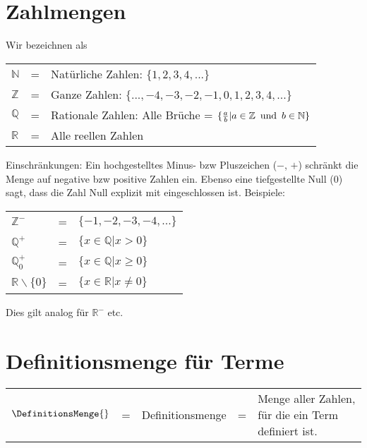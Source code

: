



\usepackage{amssymb} %
\renewcommand{\metaHeaderLine}{Theorieblatt}
\renewcommand{\arbeitsblattTitel}{Mengenbezeichnungen}

\arbeitsblattHeader{}

\section{Zahlmengen}
Wir bezeichnen als

\begin{tabular}{lcl}
  $\mathbb{N}$ &=& Natürliche Zahlen: $\{1, 2, 3, 4, ...\}$ \\
  $\mathbb{Z}$ &=& Ganze Zahlen: $\{..., -4, -3, -2, -1, 0, 1, 2, 3, 4, ...\}$ \\
  $\mathbb{Q}$ &=& Rationale Zahlen: Alle Brüche = $\{\frac{a}{b} |
  a\in\mathbb{Z}\textrm{\, und\, } b\in\mathbb{N}\}$ \\
  $\mathbb{R}$ &=& Alle reellen Zahlen\\
\end{tabular}

Einschränkungen: Ein hochgestelltes Minus- bzw Pluszeichen ($-$, $+$)
schränkt die Menge auf negative bzw positive Zahlen ein. Ebenso eine
tiefgestellte Null ($0$) sagt, dass die Zahl Null explizit mit
eingeschlossen ist. Beispiele:

\begin{tabular}{lcl}
  $\mathbb{Z}^{-}$ &=& $\{-1, -2, -3, -4, ...\}$ \\
  $\mathbb{Q}^{+}$ &=& $\{x\in \mathbb{Q} | x > 0\}$ \\
  $\mathbb{Q}^{+}_0$ &=& $\{x\in \mathbb{Q} | x \ge 0\}$ \\
  $\mathbb{R}\backslash{}\{0\}$ &=& $\{x\in \mathbb{R} | x \ne 0\}$ \\
\end{tabular}

Dies gilt analog für $\mathbb{R}^{-}$ etc.

\section{Definitionsmenge für Terme}

\begin{tabular}{lclcp{10cm}}
  $\DefinitionsMenge{}$ &=& Definitionsmenge &=& Menge aller Zahlen, für die ein Term definiert ist.\\
\end{tabular}

